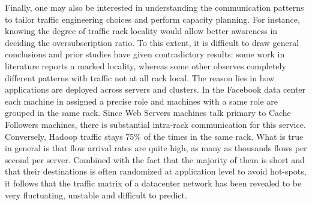 Finally, one may also be interested in understanding the communication patterns to tailor traffic engineering choices and perform capacity planning. For instance, knowing the degree of traffic rack locality would allow better awareness in deciding the oversubscription ratio. To this extent, it is difficult to draw general conclusions and prior studies have given contradictory results: some work in literature \cite{net-traffic-characteristics-benson} reports a marked locality, whereas some other observes completely different patterns with traffic not at all rack local. The reason lies in how applications are deployed across servers and clusters. In the Facebook data center each machine in assigned a precise role and machines with a same role are grouped in the same rack. Since Web Servers machines talk primary to Cache Followers machines, there is substantial intra-rack communication for this service. Conversely, Hadoop traffic stays 75\% of the times in the same rack.
What is true in general is that flow arrival rates are quite high, as many as thousands flows per second per server. Combined with the fact that the majority of them is short and that their destinations is often randomized at application level to avoid hot-spots, it follows that the traffic matrix of a datacenter network has been revealed to be very fluctuating, unstable and difficult to predict. 

